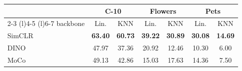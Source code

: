 
\centering
\setlength{\tabcolsep}{2pt}
\caption{\centering Pretraining\\(ViT-B, ImageNet-100-LT, 100 epochs)}
{\begin{tabular}{l cc cc cc}
    \toprule
     & \multicolumn{2}{c}{\textbf{C-10}} &  \multicolumn{2}{c}{\textbf{Flowers}} &  \multicolumn{2}{c}{\textbf{Pets}} \\
     \cmidrule(r){2-3}
     \cmidrule(l){4-5}
     \cmidrule(l){6-7}
    backbone & Lin. & KNN & Lin. & KNN & Lin. & KNN \\
    \midrule
    \multirow{1}{*}{SimCLR}     & \textbf{63.40} & \textbf{60.73} & \textbf{39.22} & \textbf{30.89} & \textbf{30.08} & \textbf{14.69}\\
    \multirow{1}{*}{DINO} & 47.97 & 37.36  & 20.92 & 12.46 & 10.30 & 6.00 \\
    \multirow{1}{*}{MoCo}    & 49.13   & 42.86  & 15.03 & 17.63 & 14.36 & 7.50\\
    \bottomrule
\end{tabular}

\label{table:pretraining-abl}}
